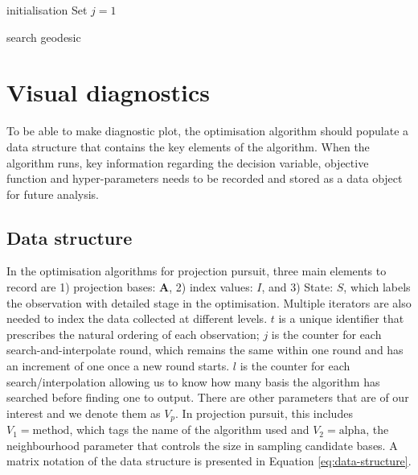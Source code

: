 \documentclass[12pt]{article}
\begin{document}
\begin{algorithm}
\SetAlgoLined
{}
  initialisation\;
  Set $j = 1$\;
  \caption{search geodesic}
  \label{search-geodesic}
\end{algorithm}

\newpage

\hypertarget{vis-diag}{%
\section{Visual diagnostics}\label{vis-diag}}

To be able to make diagnostic plot, the optimisation algorithm should
populate a data structure that contains the key elements of the
algorithm. When the algorithm runs, key information regarding the
decision variable, objective function and hyper-parameters needs to be
recorded and stored as a data object for future analysis.

\hypertarget{data-structure}{%
\subsection{Data structure}\label{data-structure}}

In the optimisation algorithms for projection pursuit, three main
elements to record are 1) projection bases: \(\mathbf{A}\), 2) index
values: \(I\), and 3) State: \(S\), which labels the observation with
detailed stage in the optimisation. Multiple iterators are also needed
to index the data collected at different levels. \(t\) is a unique
identifier that prescribes the natural ordering of each observation;
\(j\) is the counter for each search-and-interpolate round, which
remains the same within one round and has an increment of one once a new
round starts. \(l\) is the counter for each search/interpolation
allowing us to know how many basis the algorithm has searched before
finding one to output. There are other parameters that are of our
interest and we denote them as \emph{\(V_{p}\)}. In projection pursuit,
this includes \(V_1 = \text{method}\), which tags the name of the
algorithm used and \(V_2 = \text{alpha}\), the neighbourhood parameter
that controls the size in sampling candidate bases. A matrix notation of
the data structure is presented in Equation \ref{eq:data-structure}.
\end{document}

